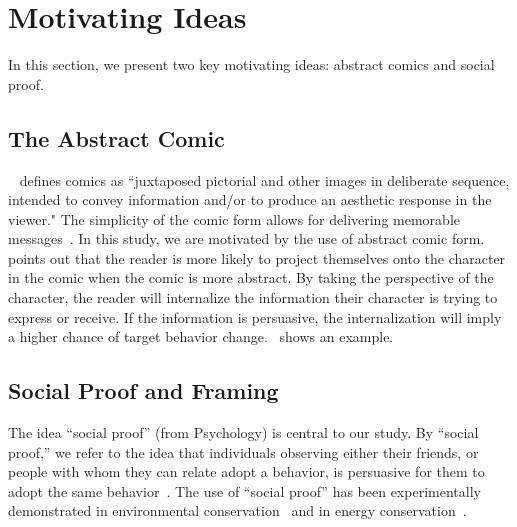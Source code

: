 
\section{Motivating Ideas}
\label{sec:Motivating Ideas}
In this section, we present two key motivating ideas: abstract comics and social proof.

\subsection{The Abstract Comic}
~\textcite{scott1993understanding} defines comics as ``juxtaposed pictorial and other images in deliberate sequence, intended to convey information and/or to produce an aesthetic response in the viewer." The simplicity of the comic form allows for delivering memorable messages~\textcite{scott1993understanding}. In this study, we are motivated by the use of abstract comic form.~\textcite{scott1993understanding} points out that the reader is more likely to project themselves onto the character in the comic when the comic is more abstract. By taking the perspective of the character, the reader will internalize the information their character is trying to express or receive. If the information is persuasive, the internalization will imply a higher chance of target behavior change.~ shows an example.

\subsection{Social Proof and Framing}
The idea ``social proof'' (from Psychology) is central to our study. By ``social proof,'' we refer to the idea that individuals observing either their friends, or people with whom they can relate adopt a behavior, is persuasive for them to adopt the same behavior~\textcite{Cialdini1993,Cialdini2004}. The use of ``social proof'' has been experimentally demonstrated in environmental conservation~\textcite{goldstein2008room} and in energy conservation~\textcite{schultz2007constructive}. %


